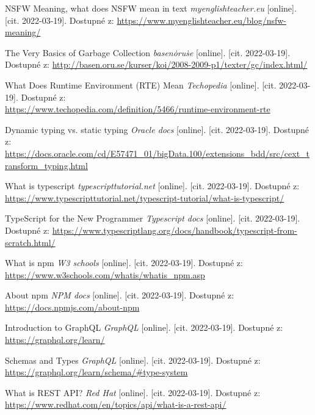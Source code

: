 \begin{thebibliography}{100}

     NSFW Meaning, what does NSFW mean in text \textit{myenglishteacher.eu} [online]. [cit. 2022-03-19]. Dostupné z: \url{https://www.myenglishteacher.eu/blog/nsfw-meaning/}
    
     The Very Basics of Garbage Collection \textit{basen\.oru\.se} [online]. [cit. 2022-03-19]. Dostupné z: \url{http://basen.oru.se/kurser/koi/2008-2009-p1/texter/gc/index.html/}
    
     What Does Runtime Environment (RTE) Mean \textit{Techopedia} [online]. [cit. 2022-03-19]. Dostupné z: \\ \url{https://www.techopedia.com/definition/5466/runtime-environment-rte}
    
     Dynamic typing vs. static typing \textit{Oracle docs} [online]. [cit. 2022-03-19]. Dostupné z: \\ \url{https://docs.oracle.com/cd/E57471_01/bigData.100/extensions_bdd/src/cext_transform_typing.html}
    
     What is typescript \textit{typescripttutorial.net} [online]. [cit. 2022-03-19]. Dostupné z: \url{https://www.typescripttutorial.net/typescript-tutorial/what-is-typescript/}
    
     TypeScript for the New Programmer \textit{Typescript docs} [online]. [cit. 2022-03-19]. Dostupné z: \url{https://www.typescriptlang.org/docs/handbook/typescript-from-scratch.html/}
    
     What is npm \textit{W3 schools} [online]. [cit. 2022-03-19]. Dostupné z: \url{https://www.w3schools.com/whatis/whatis_npm.asp}
    
     About npm \textit{NPM docs} [online]. [cit. 2022-03-19]. Dostupné z: \url{https://docs.npmjs.com/about-npm}
    
     Introduction to GraphQL \textit{GraphQL} [online]. [cit. 2022-03-19]. Dostupné z: \url{https://graphql.org/learn/}
    
     Schemas and Types \textit{GraphQL} [online]. [cit. 2022-03-19]. Dostupné z: \url{https://graphql.org/learn/schema/#type-system}
    
     What is REST API? \textit{Red Hat} [online]. [cit. 2022-03-19]. Dostupné z: \url{https://www.redhat.com/en/topics/api/what-is-a-rest-api/}
    

\end{thebibliography}

